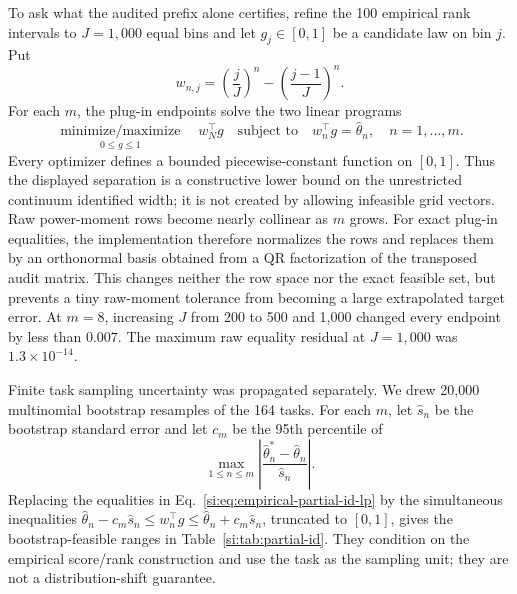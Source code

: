 \documentclass[10pt,twocolumn]{article}
\begin{document}
To ask what the audited prefix alone certifies, refine the 100 empirical rank intervals to $J=1{,}000$ equal bins and let $g_j\in[0,1]$ be a candidate law on bin $j$. Put
\begin{equation}
w_{n,j}=\left(\frac jJ\right)^n-\left(\frac{j-1}J\right)^n.
\label{si:eq:bin-mass}
\end{equation}
For each $m$, the plug-in endpoints solve the two linear programs
\begin{equation}
\underset{0\le g\le1}{\operatorname{minimize/maximize}}\quad
w_N^\top g
\quad\text{subject to}\quad
w_n^\top g=\widehat\theta_n,\quad n=1,\ldots,m.
\label{si:eq:empirical-partial-id-lp}
\end{equation}
Every optimizer defines a bounded piecewise-constant function on $[0,1]$. Thus the displayed separation is a constructive lower bound on the unrestricted continuum identified width; it is not created by allowing infeasible grid vectors. Raw power-moment rows become nearly collinear as $m$ grows. For exact plug-in equalities, the implementation therefore normalizes the rows and replaces them by an orthonormal basis obtained from a QR factorization of the transposed audit matrix. This changes neither the row space nor the exact feasible set, but prevents a tiny raw-moment tolerance from becoming a large extrapolated target error. At $m=8$, increasing $J$ from 200 to 500 and 1,000 changed every endpoint by less than $0.007$. The maximum raw equality residual at $J=1{,}000$ was $1.3\times10^{-14}$.

Finite task sampling uncertainty was propagated separately. We drew 20,000 multinomial bootstrap resamples of the 164 tasks. For each $m$, let $\widehat s_n$ be the bootstrap standard error and let $c_m$ be the 95th percentile of
\begin{equation}
\max_{1\le n\le m}
\left|\frac{\widehat\theta_n^*-\widehat\theta_n}{\widehat s_n}\right|.
\label{si:eq:max-t-band}
\end{equation}
Replacing the equalities in Eq.~\ref{si:eq:empirical-partial-id-lp} by the simultaneous inequalities
$\widehat\theta_n-c_m\widehat s_n\le w_n^\top g\le\widehat\theta_n+c_m\widehat s_n$, truncated to $[0,1]$, gives the bootstrap-feasible ranges in Table~\ref{si:tab:partial-id}. They condition on the empirical score/rank construction and use the task as the sampling unit; they are not a distribution-shift guarantee.
\end{document}
